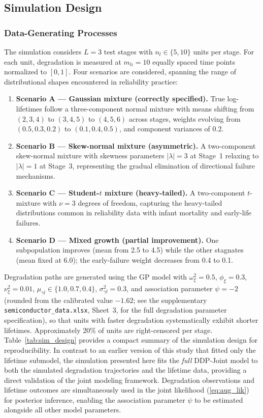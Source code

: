 \documentclass[a4paper,fleqn,longmktitle]{cas-sc}
\begin{document}
\subsection{Simulation Design}
\label{sec:sim_design}

\subsubsection{Data-Generating Processes}

The simulation considers $L = 3$ test stages with $n_l \in \{5, 10\}$ units per stage. For each unit, degradation is measured at $m_{li} = 10$ equally spaced time points normalized to $[0,1]$. Four scenarios are considered, spanning the range of distributional shapes encountered in reliability practice:

\begin{enumerate}
    \item \textbf{Scenario A --- Gaussian mixture (correctly specified).} True log-lifetimes follow a three-component normal mixture with means shifting from $(2,3,4)$ to $(3,4,5)$ to $(4,5,6)$ across stages, weights evolving from $(0.5,0.3,0.2)$ to $(0.1,0.4,0.5)$, and component variances of 0.2.
    \item \textbf{Scenario B --- Skew-normal mixture (asymmetric).} A two-component skew-normal mixture with skewness parameters $|\lambda| = 3$ at Stage~1 relaxing to $|\lambda| = 1$ at Stage~3, representing the gradual elimination of directional failure mechanisms.
    \item \textbf{Scenario C --- Student-$t$ mixture (heavy-tailed).} A two-component $t$-mixture with $\nu = 3$ degrees of freedom, capturing the heavy-tailed distributions common in reliability data with infant mortality and early-life failures.
    \item \textbf{Scenario D --- Mixed growth (partial improvement).} One subpopulation improves (mean from 2.5 to 4.5) while the other stagnates (mean fixed at 6.0); the early-failure weight decreases from 0.4 to 0.1.
\end{enumerate}

Degradation paths are generated using the GP model with $\omega_\xi^2 = 0.5$, $\phi_\xi = 0.3$, $\nu_\xi^2 = 0.01$, $\mu_{\gamma l} \in \{1.0, 0.7, 0.4\}$, $\sigma_{\gamma l}^2 = 0.3$, and association parameter $\psi = -2$ (rounded from the calibrated value $-1.62$; see the supplementary \texttt{semiconductor\_data.xlsx}, Sheet~3, for the full degradation parameter specification), so that units with faster degradation systematically exhibit shorter lifetimes. Approximately 20\% of units are right-censored per stage. Table~\ref{tab:sim_design} provides a compact summary of the simulation design for reproducibility. In contrast to an earlier version of this study that fitted only the lifetime submodel, the simulation presented here fits the \emph{full} DDP-Joint model to both the simulated degradation trajectories and the lifetime data, providing a direct validation of the joint modeling framework. Degradation observations and lifetime outcomes are simultaneously used in the joint likelihood (\ref{eq:aug_lik}) for posterior inference, enabling the association parameter $\psi$ to be estimated alongside all other model parameters.
\end{document}
